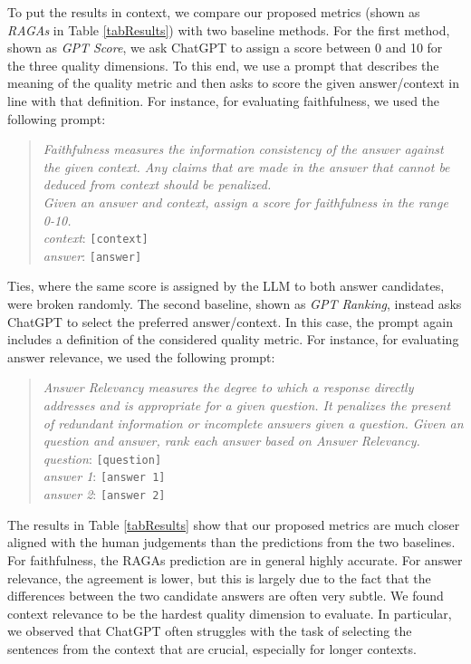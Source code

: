 \documentclass[11pt]{article}
\begin{document}
To put the results in context, we compare our proposed metrics (shown as \textit{RAGAs} in Table \ref{tabResults}) with two baseline methods. For the first method, shown as \emph{GPT Score}, we ask ChatGPT to assign a score between 0 and 10 for the three quality dimensions. To this end, we use a prompt that describes the meaning of the quality metric and then asks to score the given answer/context in line with that definition. For instance, for evaluating faithfulness, we used the following prompt:
\begin{quote}
\textit{Faithfulness measures the information consistency of the answer against the given context. Any claims that are made in the answer that cannot be deduced from context should be penalized.\\
Given an answer and context, assign a score for faithfulness in the range 0-10.\\
context}: \texttt{[context]}\\
\textit{answer}: \texttt{[answer]}
\end{quote}
Ties, where the same score is assigned by the LLM to both answer candidates, were broken randomly.
The second baseline, shown as \emph{GPT Ranking}, instead asks ChatGPT to select the preferred answer/context. In this case, the prompt again includes a definition of the considered quality metric. For instance, for evaluating answer relevance, we used the following prompt:
\begin{quote}
\textit{Answer Relevancy measures the degree to which a response directly addresses and is appropriate for a given question. It penalizes the present of redundant information or incomplete answers given a question.
Given an question and answer, rank each answer based on Answer Relevancy.\\
question}: \texttt{[question]}\\
\textit{answer 1}: \texttt{[answer 1]}\\
\textit{answer 2}: \texttt{[answer 2]}
\end{quote}

The results in Table \ref{tabResults} show that our proposed metrics are much closer aligned with the human judgements than the predictions from the two baselines. For faithfulness, the RAGAs prediction are in general highly accurate. For answer relevance, the agreement is lower, but this is largely due to the fact that the differences between the two candidate answers are often very subtle. We found context relevance to be the hardest quality dimension to evaluate. In particular, we observed that ChatGPT often struggles with the task of selecting the sentences from the context that are crucial, especially for longer contexts. 
\end{document}
